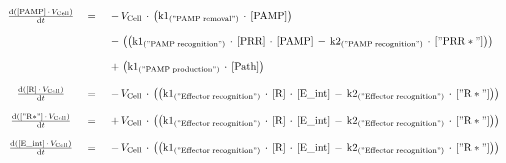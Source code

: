 
$$
\begin{array}{ccl}
\frac {\mathrm{d}\left( {{\mathrm{[PAMP]}} \, \cdot \, {V}_{\mathrm{Cell}} } \right) }  {\mathrm{d}{t} }  \; &=& \;  { \, - \, {V}_{\mathrm{Cell}} \, \cdot \, \left( {{\mathrm{k1}}_{\mathrm{("PAMP\;removal")}} \, \cdot \, {\mathrm{[PAMP]}} } \right) } \\ 
 && \\ 
 \; && \;  { \, - \, \left(\left( {{\mathrm{k1}}_{\mathrm{("PAMP\;recognition")}} \, \cdot \, {\mathrm{[PRR]}} \, \cdot \, {\mathrm{[PAMP]}} \, - \, {\mathrm{k2}}_{\mathrm{("PAMP\;recognition")}} \, \cdot \, {\mathrm{["PRR*"]}} } \right)\right) } \\ 
 && \\ 
 \; && \;  { \, + \, \left( {{\mathrm{k1}}_{\mathrm{("PAMP\;production")}} \, \cdot \, {\mathrm{[Path]}} } \right) } \\ 
 && \\ 
\frac {\mathrm{d}\left( {{\mathrm{[R]}} \, \cdot \, {V}_{\mathrm{Cell}} } \right) }  {\mathrm{d}{t} }  \; &=& \;  { \, - \, {V}_{\mathrm{Cell}} \, \cdot \, \left(\left( {{\mathrm{k1}}_{\mathrm{("Effector\;recognition")}} \, \cdot \, {\mathrm{[R]}} \, \cdot \, {\mathrm{[E\_int]}} \, - \, {\mathrm{k2}}_{\mathrm{("Effector\;recognition")}} \, \cdot \, {\mathrm{["R*"]}} } \right)\right) } \\ 
 && \\ 
\frac {\mathrm{d}\left( {{\mathrm{["R*"]}} \, \cdot \, {V}_{\mathrm{Cell}} } \right) }  {\mathrm{d}{t} }  \; &=& \;  { \, + \, {V}_{\mathrm{Cell}} \, \cdot \, \left(\left( {{\mathrm{k1}}_{\mathrm{("Effector\;recognition")}} \, \cdot \, {\mathrm{[R]}} \, \cdot \, {\mathrm{[E\_int]}} \, - \, {\mathrm{k2}}_{\mathrm{("Effector\;recognition")}} \, \cdot \, {\mathrm{["R*"]}} } \right)\right) } \\ 
 && \\ 
\frac {\mathrm{d}\left( {{\mathrm{[E\_int]}} \, \cdot \, {V}_{\mathrm{Cell}} } \right) }  {\mathrm{d}{t} }  \; &=& \;  { \, - \, {V}_{\mathrm{Cell}} \, \cdot \, \left(\left( {{\mathrm{k1}}_{\mathrm{("Effector\;recognition")}} \, \cdot \, {\mathrm{[R]}} \, \cdot \, {\mathrm{[E\_int]}} \, - \, {\mathrm{k2}}_{\mathrm{("Effector\;recognition")}} \, \cdot \, {\mathrm{["R*"]}} } \right)\right) } \\ 
 && \\ 

\end{array}$$
